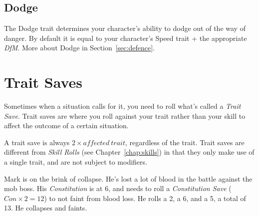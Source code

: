 \subsection{Dodge}
The Dodge trait determines your character's ability to dodge out of the way of danger. 
By default it is equal to your character's Speed trait + the appropriate \textit{DfM}.
More about Dodge in Section~\ref{sec:defence}.

\section{Trait Saves}
Sometimes when a situation calls for it, you need to roll what's called a \textit{Trait Save}.
Trait saves are where you roll against your trait rather than your skill to affect the outcome of a certain situation.

A trait save is always $2 \times \mathit{affected\ trait}$, regardless of the trait.
Trait saves are different from \textit{Skill Rolls} (see Chapter~\ref{chap:skills}) in that they only make use of a single trait, and are not subject to modifiers.

\begin{example} 
    Mark is on the brink of collapse.
    He's lost a lot of blood in the battle against the mob boss.
    His \textit{Constitution} is at 6, and needs to roll a \textit{Constitution Save} ($Con \times 2 = 12$) to not faint from blood loss.
    He rolls a 2, a 6, and a 5, a total of 13. He collapses and faints.
\end{example}
